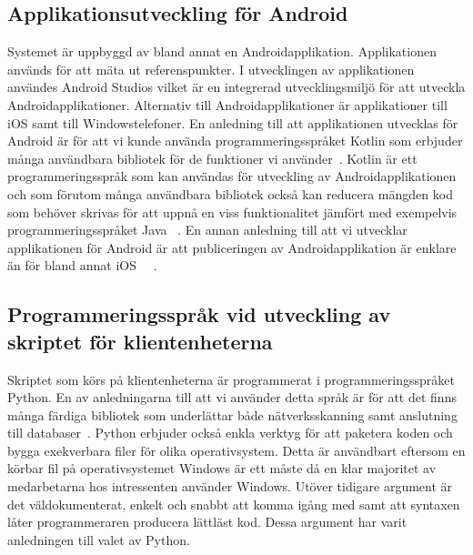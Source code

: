 \documentclass[a4paper,12pt]{article}
\begin{document}
 \subsection{Applikationsutveckling för Android}
 Systemet är uppbyggd av bland annat en Androidapplikation. Applikationen används för att mäta ut referenspunkter. I utvecklingen av applikationen användes Android Studios vilket är en integrerad utvecklingsmiljö för att utveckla Androidapplikationer. Alternativ till Androidapplikationer är applikationer till iOS samt till Windowstelefoner. En anledning till att applikationen utvecklas för Android är för att vi kunde använda programmeringsspråket Kotlin som erbjuder många användbara bibliotek för de funktioner vi använder~\cite{kotlin}. Kotlin är ett programmeringsspråk som kan användas för utveckling av Androidapplikationen och som
 förutom många användbara bibliotek också kan reducera mängden kod som behöver skrivas för att uppnå en viss funktionalitet jämfört med exempelvis programmeringsspråket Java ~\cite{kotlin}.
 En annan anledning till att vi utvecklar applikationen för Android är att publiceringen av Androidapplikation är enklare än för bland annat iOS ~\cite{submitIphone}~\cite{android}.

 \subsection{Programmeringsspråk vid utveckling av skriptet för klientenheterna}\label{pythonskript}
 Skriptet som körs på klientenheterna är programmerat i programmeringsspråket Python. En av anledningarna till att vi använder detta språk är för att det finns många färdiga bibliotek som underlättar både nätverksskanning samt anslutning till databaser~\cite{python}. Python erbjuder också enkla verktyg för att paketera koden och bygga exekverbara filer för olika operativsystem. Detta är användbart eftersom en körbar fil på operativsystemet Windows är ett måste då en klar majoritet av medarbetarna hos intressenten använder Windows. Utöver tidigare argument är det väldokumenterat, enkelt och snabbt att komma igång med samt att syntaxen låter programmeraren producera lättläst kod. Dessa argument har varit anledningen till valet av Python.
\end{document}
